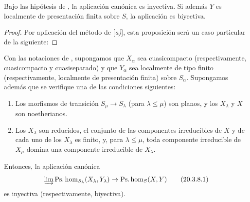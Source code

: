 \begin{proposition}[20.3.7]
\label{IV.20.3.7}
Bajo las hipótesis de , la aplicación canónica  es inyectiva.
Si además $Y$ es localmente de presentación finita sobre $S$, la aplicación  es biyectiva.
\end{proposition}

\begin{proof}
Por aplicación del método de [\emph{a)}], esta proposición será un caso particular de la siguiente:
\end{proof}

\begin{proposition}[20.3.8]
\label{IV.20.3.8}
Con las notaciones de , supongamos que $X_\alpha$ sea cuasicompacto \textup{(respectivamente,} cuasicompacto y cuasiseparado) y que $Y_\alpha$ sea localmente de tipo finito \textup{(respectivamente,} localmente de presentación finita) sobre $S_\alpha$.
Supongamos además que se verifique una de las condiciones siguientes:
\begin{enumerate}[label=\emph{(\roman*)}]
  \item Los morfismos de transición $S_\mu\to S_\lambda$ (para $\lambda\leq\mu$) son planos, y los $X_\lambda$ y $X$ son noetherianos.
  \item Los $X_\lambda$ son reducidos, el conjunto de las componentes irreducibles de $X$ y de cada uno de los $X_\lambda$ es finito, y, para $\lambda\leq\mu$, toda componente irreducible de $X_\mu$ domina una componente irreducible de $X_\lambda$.
\end{enumerate}
Entonces, la aplicación canónica
\[
\label{IV.20.3.8.1}
  \varinjlim\operatorname{Ps.hom}_{S_\lambda}(X_\lambda,Y_\lambda)\to\operatorname{Ps.hom}_S(X,Y)
  \tag{20.3.8.1}
\]
es inyectiva \textup{(respectivamente,} biyectiva).
\end{proposition}

